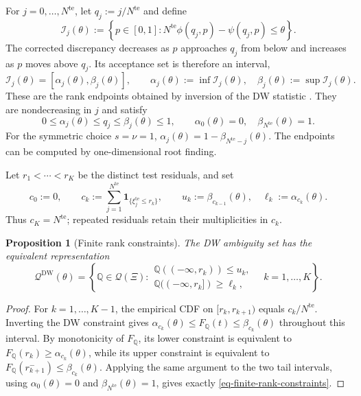 \documentclass[review,11pt,3p,authoryear,nopreprintline]{elsarticle}
\newtheorem{proposition}{Proposition}
\begin{document}
For $j=0,\ldots,N^{\mathrm{te}}$, let $q_j:=j/N^{\mathrm{te}}$ and define
\begin{equation}
  \mathcal I_j(\theta):=
  \left\{p\in[0,1]:
  N^{\mathrm{te}}\phi(q_j,p)-\psi(q_j,p)\le\theta\right\}.
  \label{eq-dw-rank-acceptance}
\end{equation}
The corrected discrepancy decreases as $p$ approaches $q_j$ from below and increases as $p$ moves above $q_j$. Its acceptance set is therefore an interval,
\begin{equation}
  \mathcal I_j(\theta)=[\alpha_j(\theta),\beta_j(\theta)],
  \qquad
  \alpha_j(\theta):=\inf\mathcal I_j(\theta),\quad
  \beta_j(\theta):=\sup\mathcal I_j(\theta).
  \label{eq-dw-rank-endpoints}
\end{equation}
These are the rank endpoints obtained by inversion of the DW statistic \citep{L.J23}. They are nondecreasing in $j$ and satisfy
\[
  0\le\alpha_j(\theta)\le q_j\le\beta_j(\theta)\le1,
  \qquad
  \alpha_0(\theta)=0,\quad
  \beta_{N^{\mathrm{te}}}(\theta)=1.
\]
For the symmetric choice $s=\nu=1$, $\alpha_j(\theta)=1-\beta_{N^{\mathrm{te}}-j}(\theta)$. The endpoints can be computed by one-dimensional root finding.

Let $r_1<\cdots<r_K$ be the distinct test residuals, and set
\begin{equation}
  c_0:=0,\qquad
  c_k:=\sum_{j=1}^{N^{\mathrm{te}}}\mathbf1_{\{\xi_j^{\mathrm{te}}\le r_k\}},
  \qquad
  u_k:=\beta_{c_{k-1}}(\theta),\quad
  \ell_k:=\alpha_{c_k}(\theta).
  \label{eq-dw-counts-and-levels}
\end{equation}
Thus $c_K=N^{\mathrm{te}}$; repeated residuals retain their multiplicities in $c_k$.

\begin{proposition}[Finite rank constraints]
  \label{prop-finite-rank-constraints}
  The DW ambiguity set has the equivalent representation
  \begin{equation}
    \mathscr Q^{\mathrm{DW}}(\theta)=
    \left\{\mathbb Q\in\mathcal Q(\Xi):
    \begin{array}{ll}
      \mathbb Q((-\infty,r_k))\le u_k,\\
      \mathbb Q((-\infty,r_k])\ge\ell_k,
    \end{array}
    \quad k=1,\ldots,K\right\}.
    \label{eq-finite-rank-constraints}
  \end{equation}
\end{proposition}
\begin{proof}
  For $k=1,\ldots,K-1$, the empirical CDF on $[r_k,r_{k+1})$ equals $c_k/N^{\mathrm{te}}$. Inverting the DW constraint gives
  $\alpha_{c_k}(\theta)\le F_{\mathbb Q}(t)\le\beta_{c_k}(\theta)$ throughout this interval. By monotonicity of $F_{\mathbb Q}$, its lower constraint is equivalent to
  $F_{\mathbb Q}(r_k)\ge\alpha_{c_k}(\theta)$, while its upper constraint is equivalent to
  $F_{\mathbb Q}(r_{k+1}^-)\le\beta_{c_k}(\theta)$. Applying the same argument to the two tail intervals, using $\alpha_0(\theta)=0$ and $\beta_{N^{\mathrm{te}}}(\theta)=1$, gives exactly \eqref{eq-finite-rank-constraints}.
\end{proof}
\end{document}
